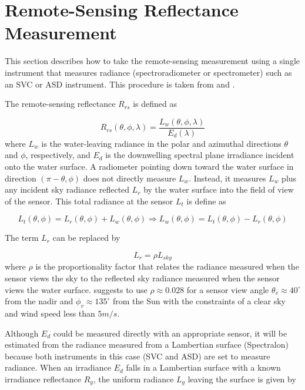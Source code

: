 \documentclass[]{spie}  %
\begin{document}
\newpage
\section{Remote-Sensing Reflectance Measurement}
This section describes how to take the remote-sensing measurement using a single instrument that measures radiance (spectroradiometer or spectrometer) such as an SVC or ASD instrument. This procedure is taken from \cite{Mobley:1999} and \cite{Mueller1995}. 

The remote-sensing reflectance $R_{rs}$ is defined as

\begin{equation}\label{eq:Rrs}
	R_{rs}(\theta,\phi,\lambda)=\frac{L_w(\theta,\phi,\lambda)}{E_d(\lambda)}
\end{equation}
where $L_w$ is the water-leaving radiance in the polar and azimuthal directions $\theta$ and $\phi$, respectively, and $E_d$ is the downwelling spectral plane irradiance incident onto the water surface. A radiometer pointing down toward the water surface in direction $(\pi-\theta,\phi)$ does not directly measure $L_w$. Instead, it measures $L_w$  plus any incident sky radiance reflected $L_r$ by the water surface into the field of view of the sensor. This total radiance at the sensor $L_t$ is define as

\begin{equation}\label{eq:Lt}
	L_t(\theta,\phi) = L_r(\theta,\phi)+L_w(\theta,\phi)\Rightarrow L_w(\theta,\phi)=L_t(\theta,\phi) - L_r(\theta,\phi)
\end{equation}

The term $L_r$ can be replaced by

\begin{equation}\label{eq:Lsky}
	L_r = \rho L_{sky}
\end{equation}
where $\rho$ is the proportionality factor that relates the radiance measured when the sensor views the sky to the reflected sky radiance measured when the sensor views the water surface. \cite{Mobley:1999} suggests to use $\rho \approx 0.028$ for a sensor view angle $\theta_v \approx 40^\circ$ from the nadir and  $\phi_v \approx 135^\circ$ from the Sun with the constraints of a clear sky and wind speed less than $5m/s$.

Although $E_d$ could be measured directly with an appropriate sensor, it will be estimated from the radiance measured from a Lambertian surface (Spectralon) because both instruments in this case (SVC and ASD) are set to measure radiance. When an irradiance $E_d$ falls in a Lambertian surface with a known irradiance reflectance $R_g$, the uniform radiance $L_g$ leaving the surface is given by 
\end{document}
